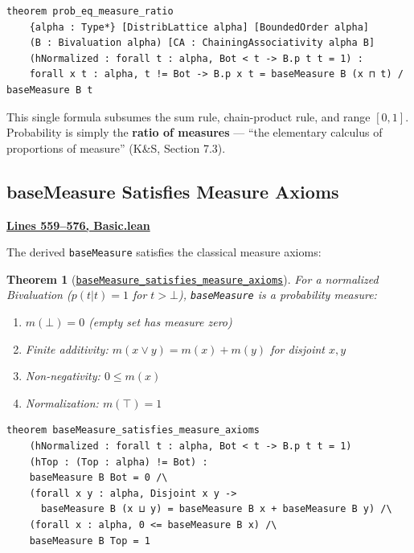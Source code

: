 \documentclass[11pt]{article}
\newtheorem{theorem}{Theorem}[section]
\theoremstyle{definition}
\theoremstyle{remark}
\begin{document}
\begin{lstlisting}[caption={\texttt{prob\_eq\_measure\_ratio} (\href{https://github.com/zariuq/ks-foundations-of-inference/blob/main/KnuthSkilling/Probability/ConditionalProbability/Basic.lean\#L714}{Basic.lean:714})},numbers=none]
theorem prob_eq_measure_ratio
    {alpha : Type*} [DistribLattice alpha] [BoundedOrder alpha]
    (B : Bivaluation alpha) [CA : ChainingAssociativity alpha B]
    (hNormalized : forall t : alpha, Bot < t -> B.p t t = 1) :
    forall x t : alpha, t != Bot -> B.p x t = baseMeasure B (x ⊓ t) / baseMeasure B t
\end{lstlisting}

This single formula subsumes the sum rule, chain-product rule, and range $[0,1]$. Probability is simply the \textbf{ratio of measures} --- ``the elementary calculus of proportions of measure'' (K\&S, Section 7.3).

\subsection{baseMeasure Satisfies Measure Axioms}

\textbf{\href{https://github.com/zariuq/ks-foundations-of-inference/blob/main/KnuthSkilling/Probability/ConditionalProbability/Basic.lean\#L559-L576}{Lines 559--576, Basic.lean}}

The derived \texttt{baseMeasure} satisfies the classical measure axioms:

\begin{theorem}[\href{https://github.com/zariuq/ks-foundations-of-inference/blob/main/KnuthSkilling/Probability/ConditionalProbability/Basic.lean\#L559}{\texttt{baseMeasure\_satisfies\_measure\_axioms}}]
For a normalized Bivaluation ($p(t|t) = 1$ for $t > \bot$), \texttt{baseMeasure} is a probability measure:
\begin{enumerate}
\item $m(\bot) = 0$ (empty set has measure zero)
\item Finite additivity: $m(x \vee y) = m(x) + m(y)$ for disjoint $x, y$
\item Non-negativity: $0 \leq m(x)$
\item Normalization: $m(\top) = 1$
\end{enumerate}
\end{theorem}

\begin{lstlisting}[caption={\texttt{baseMeasure\_satisfies\_measure\_axioms} (\href{https://github.com/zariuq/ks-foundations-of-inference/blob/main/KnuthSkilling/Probability/ConditionalProbability/Basic.lean\#L559}{Basic.lean:559})},numbers=none]
theorem baseMeasure_satisfies_measure_axioms
    (hNormalized : forall t : alpha, Bot < t -> B.p t t = 1)
    (hTop : (Top : alpha) != Bot) :
    baseMeasure B Bot = 0 /\
    (forall x y : alpha, Disjoint x y ->
      baseMeasure B (x ⊔ y) = baseMeasure B x + baseMeasure B y) /\
    (forall x : alpha, 0 <= baseMeasure B x) /\
    baseMeasure B Top = 1
\end{lstlisting}
\end{document}
